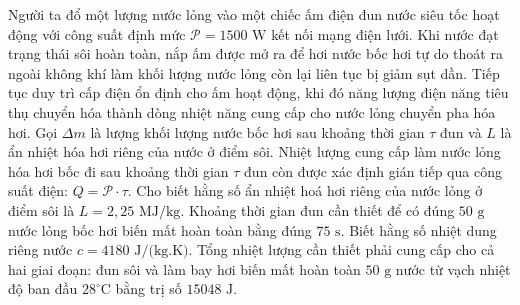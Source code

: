 \begin{ex}	Người ta đổ một lượng nước lỏng vào một chiếc ấm điện đun nước siêu tốc hoạt động với công suất định mức $\mathcal{P} = 1500\text{ W}$ kết nối mạng điện lưới. Khi nước đạt trạng thái sôi hoàn toàn, nắp ấm được mở ra để hơi nước bốc hơi tự do thoát ra ngoài không khí làm khối lượng nước lỏng còn lại liên tục bị giảm sụt dần. Tiếp tục duy trì cấp điện ổn định cho ấm hoạt động, khi đó năng lượng điện năng tiêu thụ chuyển hóa thành dòng nhiệt năng cung cấp cho nước lỏng chuyển pha hóa hơi. Gọi $\Delta m$ là lượng khối lượng nước bốc hơi sau khoảng thời gian $\tau$ đun và $L$ là ẩn nhiệt hóa hơi riêng của nước ở điểm sôi.
	{\True Nhiệt lượng cung cấp làm nước lỏng hóa hơi bốc đi sau khoảng thời gian $\tau$ đun còn được xác định gián tiếp qua công suất điện: $Q = \mathcal{P} \cdot \tau$.}
	{\True Cho biết hằng số ẩn nhiệt hoá hơi riêng của nước lỏng ở điểm sôi là $L = 2,25\text{ MJ/kg}$. Khoảng thời gian đun cần thiết để có đúng $50\text{ g}$ nước lỏng bốc hơi biến mất hoàn toàn bằng đúng $75\text{ s}$.}
	{Biết hằng số nhiệt dung riêng nước $c = 4180\text{ J/(kg.K)}$. Tổng nhiệt lượng cần thiết phải cung cấp cho cả hai giai đoạn: đun sôi và làm bay hơi biến mất hoàn toàn $50\text{ g}$ nước từ vạch nhiệt độ ban đầu $28^\circ\text{C}$ bằng trị số $15048\text{ J}$.}
\end{ex}


